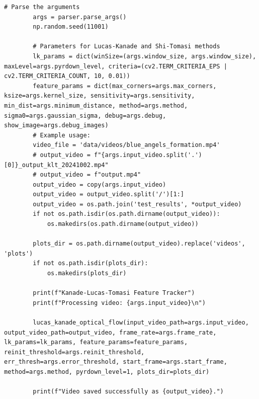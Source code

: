 \documentclass[11pt, conference, letterpaper]{IEEEtran}
\begin{document}
\begin{lstlisting}[style=python, caption={\texttt{lucas\_kanade.py}}, label={lst:lk}]
        # Parse the arguments
        args = parser.parse_args()
        np.random.seed(11001)
        
        # Parameters for Lucas-Kanade and Shi-Tomasi methods
        lk_params = dict(winSize=(args.window_size, args.window_size), maxLevel=args.pyrdown_level, criteria=(cv2.TERM_CRITERIA_EPS | cv2.TERM_CRITERIA_COUNT, 10, 0.01))
        feature_params = dict(max_corners=args.max_corners, ksize=args.kernel_size, sensitivity=args.sensitivity, min_dist=args.minimum_distance, method=args.method, sigma0=args.gaussian_sigma, debug=args.debug, show_image=args.debug_images)
        # Example usage:
        video_file = 'data/videos/blue_angels_formation.mp4'
        # output_video = f"{args.input_video.split('.')[0]}_output_klt_20241002.mp4"
        # output_video = f"output.mp4"
        output_video = copy(args.input_video)
        output_video = output_video.split('/')[1:]
        output_video = os.path.join('test_results', *output_video)
        if not os.path.isdir(os.path.dirname(output_video)):
            os.makedirs(os.path.dirname(output_video))
        
        plots_dir = os.path.dirname(output_video).replace('videos', 'plots')
        if not os.path.isdir(plots_dir):
            os.makedirs(plots_dir)
        
        print(f"Kanade-Lucas-Tomasi Feature Tracker")
        print(f"Processing video: {args.input_video}\n")
        
        lucas_kanade_optical_flow(input_video_path=args.input_video, output_video_path=output_video, frame_rate=args.frame_rate, lk_params=lk_params, feature_params=feature_params, reinit_threshold=args.reinit_threshold, err_thresh=args.error_threshold, start_frame=args.start_frame, method=args.method, pyrdown_level=1, plots_dir=plots_dir)
        
        print(f"Video saved successfully as {output_video}.")
\end{lstlisting}
\end{document}
